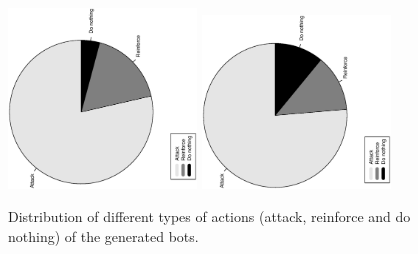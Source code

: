 \documentclass[conference]{IEEEtran}
\begin{document}
\begin{figure}[htb]
\tiny
\begin{center}


    \includegraphics[trim=1cm 7cm 1cm 7cm, clip=true,width=5cm,angle=-90]{./imags/distribution_initial_action.eps}
    \includegraphics[trim=1cm 7cm 1cm 7cm, clip=true,width=5cm,angle=-90]{./imags/distribution_final_action.eps}


\end{center}
\caption{Distribution of different types of actions (attack, reinforce and do nothing) of the generated bots.}
\label{figura:tarta_actions}
\end{figure}
\end{document}
